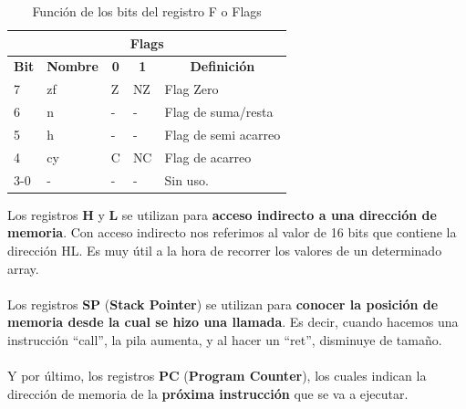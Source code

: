 \begin{table}[h!]
\centering
\begin{tabular}{|l|l|l|l|l|}

\hline

\multicolumn{5}{|c|}{\textbf{Flags}}                                                                                                                 \\ \hline

\multicolumn{1}{|c|}{\textbf{Bit}} & \multicolumn{1}{c|}{\textbf{Nombre}} & \multicolumn{1}{c|}{\textbf{0}} & \multicolumn{1}{c|}{\textbf{1}} & \multicolumn{1}{c|}{\textbf{Definición}} \\ \hline

7                         & zf                          & Z                      & NZ                     & Flag Zero                       \\ \hline

6                         & n                           & -                      & -                      & Flag de suma/resta              \\ \hline

5                         & h                           & -                      & -                      & Flag de semi acarreo            \\ \hline

4                         & cy                          & C                      & NC                     & Flag de acarreo                 \\ \hline

3-0                       & -                           & -                      & -                      & Sin uso.                        \\ \hline
\end{tabular}

\caption{Función de los bits del registro F o Flags}

\label{table:2}
\end{table}

Los registros \textbf{H} y \textbf{L} se utilizan para \textbf{acceso indirecto a una dirección de memoria}. Con acceso indirecto nos referimos al valor de 16 bits que contiene la dirección HL. Es muy útil a la hora de recorrer los valores de un determinado array.
\\ \\
Los registros \textbf{SP} (\textbf{Stack Pointer}) se utilizan para \textbf{conocer la posición de memoria desde la cual se hizo una llamada}. Es decir, cuando hacemos una instrucción ``call'', la pila aumenta, y al hacer un ``ret'', disminuye de tamaño.
\\ \\
Y por último, los registros \textbf{PC} (\textbf{Program Counter}), los cuales indican la dirección de memoria de la \textbf{próxima instrucción} que se va a ejecutar.

